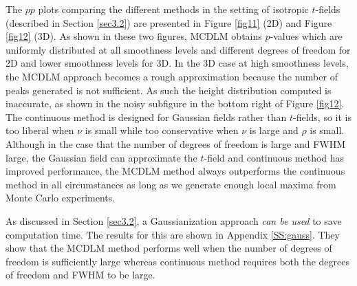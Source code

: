 \documentclass{article}
\newcommand{\nt}[1]{\textit{\color{red} #1}}
\begin{document}
The $pp$ plots comparing the different methods in the setting of isotropic $t$-fields (described in Section \ref{sec3.2}) are presented in Figure \ref{fig11} (2D) and Figure \ref{fig12} (3D). As shown in these two figures, MCDLM obtains $p$-values which are uniformly distributed at all smoothness levels and different degrees of freedom for 2D and lower smoothness levels for 3D. In the 3D case at high smoothness levels, the MCDLM approach becomes a rough approximation because the number of peaks generated is not sufficient. As such the height distribution computed is inaccurate, as shown in the noisy subfigure in the bottom right of Figure \ref{fig12}. The continuous method is designed for Gaussian fields rather than $t$-fields, so it is too liberal when $\nu$ is small while too conservative when $\nu$ is large and $\rho$ is small. Although in the case that the number of degrees of freedom is large and FWHM large, the Gaussian field can approximate the $t$-field and continuous method has improved performance, the MCDLM method always outperforms the continuous method in all circumstances as long as we generate enough local maxima from Monte Carlo experiments. 

As discussed in Section \ref{sec3.2}, a Gaussianization approach \nt{can be used} to save computation time. The results for this are shown in Appendix \ref{SS:gauss}. They show that the MCDLM method performs well when the number of degrees of freedom is sufficiently large whereas continuous method requires both the degrees of freedom and FWHM to be large.
\end{document}
